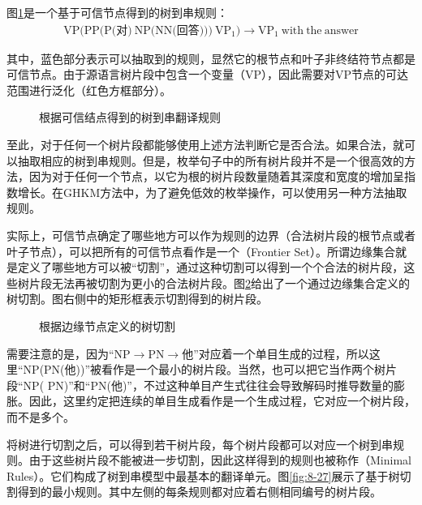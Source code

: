 \parinterval 图\ref{fig:8-25}是一个基于可信节点得到的树到串规则：
\begin{eqnarray}
\textrm{VP(PP(P(对)}\ \textrm{NP(NN(回答)))}\ \textrm{VP}_1) \rightarrow \textrm{VP}_1\ \textrm{with}\ \textrm{the}\ \textrm{answer} \nonumber
\end{eqnarray}

\noindent 其中，蓝色部分表示可以抽取到的规则，显然它的根节点和叶子非终结符节点都是可信节点。由于源语言树片段中包含一个变量（VP），因此需要对VP节点的可达范围进行泛化（红色方框部分）。

\begin{figure}[htp]
\centering

\caption{根据可信结点得到的树到串翻译规则}
\label{fig:8-25}
\end{figure}

\parinterval 至此，对于任何一个树片段都能够使用上述方法判断它是否合法。如果合法，就可以抽取相应的树到串规则。但是，枚举句子中的所有树片段并不是一个很高效的方法，因为对于任何一个节点，以它为根的树片段数量随着其深度和宽度的增加呈指数增长。在GHKM方法中，为了避免低效的枚举操作，可以使用另一种方法抽取规则。

\parinterval 实际上，可信节点确定了哪些地方可以作为规则的边界（合法树片段的根节点或者叶子节点），可以把所有的可信节点看作是一个{\small{}}（Frontier Set）。所谓边缘集合就是定义了哪些地方可以被“切割”，通过这种切割可以得到一个个合法的树片段，这些树片段无法再被切割为更小的合法树片段。图\ref{fig:8-26}给出了一个通过边缘集合定义的树切割。图右侧中的矩形框表示切割得到的树片段。

\begin{figure}[htp]
\centering

\caption{根据边缘节点定义的树切割}
\label{fig:8-26}
\end{figure}

\parinterval 需要注意的是，因为“NP$\rightarrow$PN$\rightarrow$他”对应着一个单目生成的过程，所以这里“NP(PN(他))”被看作是一个最小的树片段。当然，也可以把它当作两个树片段“NP( PN)”和“PN(他)”，不过这种单目产生式往往会导致解码时推导数量的膨胀。因此，这里约定把连续的单目生成看作是一个生成过程，它对应一个树片段，而不是多个。

\parinterval 将树进行切割之后，可以得到若干树片段，每个树片段都可以对应一个树到串规则。由于这些树片段不能被进一步切割，因此这样得到的规则也被称作{\small{}}（Minimal Rules）。它们构成了树到串模型中最基本的翻译单元。图\ref{fig:8-27}展示了基于树切割得到的最小规则。其中左侧的每条规则都对应着右侧相同编号的树片段。


